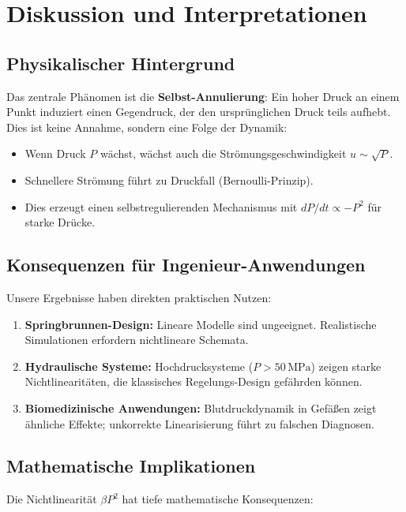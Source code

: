 \documentclass[a4paper,12pt]{article}
\theoremstyle{definition}
\begin{document}
\section{Diskussion und Interpretationen}

\subsection{Physikalischer Hintergrund}

Das zentrale Phänomen ist die \textbf{Selbst-Annulierung}: Ein hoher Druck an einem Punkt induziert einen Gegendruck, der den ursprünglichen Druck teils aufhebt. Dies ist keine Annahme, sondern eine Folge der Dynamik:

\begin{itemize}
	\item Wenn Druck $P$ wächst, wächst auch die Strömungsgeschwindigkeit $u \sim \sqrt{P}$.
	\item Schnellere Strömung führt zu Druckfall (Bernoulli-Prinzip).
	\item Dies erzeugt einen selbstregulierenden Mechanismus mit $dP/dt \propto -P^2$ für starke Drücke.
\end{itemize}

\subsection{Konsequenzen für Ingenieur-Anwendungen}

Unsere Ergebnisse haben direkten praktischen Nutzen:

\begin{enumerate}
	\item \textbf{Springbrunnen-Design:} Lineare Modelle sind ungeeignet. Realistische Simulationen erfordern nichtlineare Schemata.
	\item \textbf{Hydraulische Systeme:} Hochdrucksysteme ($P > 50 \, \text{MPa}$) zeigen starke Nichtlinearitäten, die klassisches Regelungs-Design gefährden können.
	\item \textbf{Biomedizinische Anwendungen:} Blutdruckdynamik in Gefäßen zeigt ähnliche Effekte; unkorrekte Linearisierung führt zu falschen Diagnosen.
\end{enumerate}

\subsection{Mathematische Implikationen}

Die Nichtlinearität $\beta P^2$ hat tiefe mathematische Konsequenzen:
\end{document}

